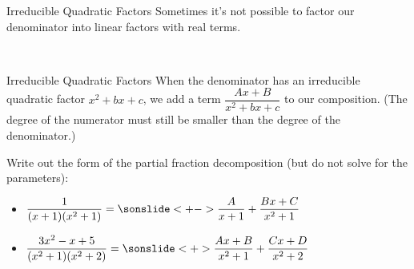 \begin{frame}[t]{Irreducible Quadratic Factors}
Sometimes it's not possible to factor our denominator into linear factors with real terms.\vfill

\begin{multicols}{2}
\\
\columnbreak
\begin{center}
\end{center}

\end{multicols}
\end{frame}
\begin{frame}[t]{Irreducible Quadratic Factors}
When the denominator has an irreducible quadratic factor $x^2+bx+c$, we add a term $\dfrac{Ax+B}{x^2+bx+c}$ to our composition. (The degree of the numerator must still be smaller than the degree of the denominator.)

Write out the form of the partial fraction decomposition (but do not solve for the parameters):
\vfill
\begin{itemize}[<+->]
\item
$\ds\frac{1}{(x+1)(x^2+1)}=\sonslide<+->{\frac{A}{x+1}+\frac{Bx+C}{x^2+1}}$\vfill
\item
$\ds\frac{3x^2-x+5}{(x^2+1)(x^2+2)}=\sonslide<+>{\frac{Ax+B}{x^2+1}+\frac{Cx+D}{x^2+2}}$\vfill
\end{itemize}
\end{frame}
